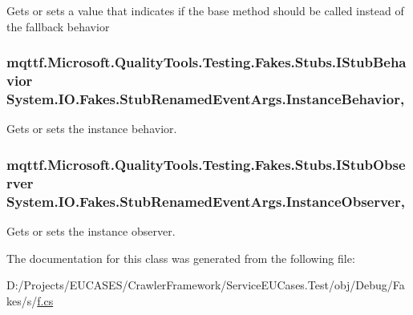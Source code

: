 Gets or sets a value that indicates if the base method should be called instead of the fallback behavior

\hypertarget{class_system_1_1_i_o_1_1_fakes_1_1_stub_renamed_event_args_ae42511c4253eaa9776f129df3654e016}{
\subsubsection[{Instance\-Behavior}]{\setlength{\rightskip}{0pt plus 5cm}mqttf.\-Microsoft.\-Quality\-Tools.\-Testing.\-Fakes.\-Stubs.\-I\-Stub\-Behavior System.\-I\-O.\-Fakes.\-Stub\-Renamed\-Event\-Args.\-Instance\-Behavior\hspace{0.3cm}{\ttfamily [get]}, {\ttfamily [set]}}}\label{class_system_1_1_i_o_1_1_fakes_1_1_stub_renamed_event_args_ae42511c4253eaa9776f129df3654e016}


Gets or sets the instance behavior.

\hypertarget{class_system_1_1_i_o_1_1_fakes_1_1_stub_renamed_event_args_ac66181b74cf0f7848474375351d8406b}{
\subsubsection[{Instance\-Observer}]{\setlength{\rightskip}{0pt plus 5cm}mqttf.\-Microsoft.\-Quality\-Tools.\-Testing.\-Fakes.\-Stubs.\-I\-Stub\-Observer System.\-I\-O.\-Fakes.\-Stub\-Renamed\-Event\-Args.\-Instance\-Observer\hspace{0.3cm}{\ttfamily [get]}, {\ttfamily [set]}}}\label{class_system_1_1_i_o_1_1_fakes_1_1_stub_renamed_event_args_ac66181b74cf0f7848474375351d8406b}


Gets or sets the instance observer.



The documentation for this class was generated from the following file\-:\begin{DoxyCompactItemize}
\item 
D\-:/\-Projects/\-E\-U\-C\-A\-S\-E\-S/\-Crawler\-Framework/\-Service\-E\-U\-Cases.\-Test/obj/\-Debug/\-Fakes/s/\hyperlink{s_2f_8cs}{f.\-cs}\end{DoxyCompactItemize}
